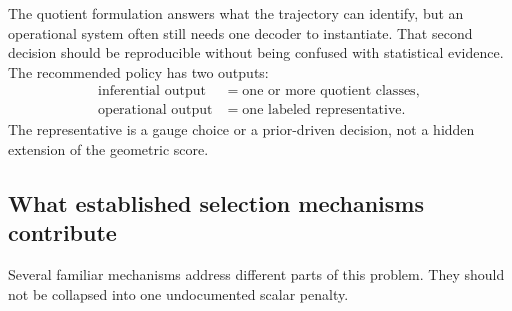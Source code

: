 \documentclass[11pt]{article}
\begin{document}
    The quotient formulation answers what the trajectory can identify, but an operational
    system often still needs one decoder to instantiate. That second decision should be
    reproducible without being confused with statistical evidence. The recommended policy
    has two outputs:
    \begin{align}
        \text{inferential output}
        &=\text{one or more quotient classes},\\
        \text{operational output}
        &=\text{one labeled representative}.
    \end{align}
    The representative is a gauge choice or a prior-driven decision, not a hidden extension
    of the geometric score.

    \subsection{What established selection mechanisms contribute}

    Several familiar mechanisms address different parts of this problem. They should not be
    collapsed into one undocumented scalar penalty.
\end{document}

